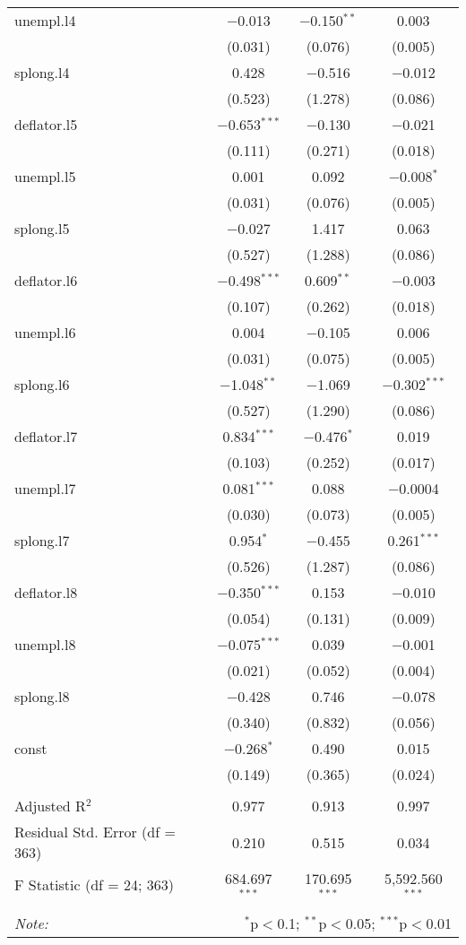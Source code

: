 \begin{table}[!htbp]
\begin{tabular}{@{\extracolsep{5pt}}lccc}
  unempl.l4 & $-$0.013 & $-$0.150$^{**}$ & 0.003 \\ 
  & (0.031) & (0.076) & (0.005) \\ 
  splong.l4 & 0.428 & $-$0.516 & $-$0.012 \\ 
  & (0.523) & (1.278) & (0.086) \\ 
  deflator.l5 & $-$0.653$^{***}$ & $-$0.130 & $-$0.021 \\ 
  & (0.111) & (0.271) & (0.018) \\ 
  unempl.l5 & 0.001 & 0.092 & $-$0.008$^{*}$ \\ 
  & (0.031) & (0.076) & (0.005) \\ 
  splong.l5 & $-$0.027 & 1.417 & 0.063 \\ 
  & (0.527) & (1.288) & (0.086) \\ 
  deflator.l6 & $-$0.498$^{***}$ & 0.609$^{**}$ & $-$0.003 \\ 
  & (0.107) & (0.262) & (0.018) \\ 
  unempl.l6 & 0.004 & $-$0.105 & 0.006 \\ 
  & (0.031) & (0.075) & (0.005) \\ 
  splong.l6 & $-$1.048$^{**}$ & $-$1.069 & $-$0.302$^{***}$ \\ 
  & (0.527) & (1.290) & (0.086) \\ 
  deflator.l7 & 0.834$^{***}$ & $-$0.476$^{*}$ & 0.019 \\ 
  & (0.103) & (0.252) & (0.017) \\ 
  unempl.l7 & 0.081$^{***}$ & 0.088 & $-$0.0004 \\ 
  & (0.030) & (0.073) & (0.005) \\ 
  splong.l7 & 0.954$^{*}$ & $-$0.455 & 0.261$^{***}$ \\ 
  & (0.526) & (1.287) & (0.086) \\ 
  deflator.l8 & $-$0.350$^{***}$ & 0.153 & $-$0.010 \\ 
  & (0.054) & (0.131) & (0.009) \\ 
  unempl.l8 & $-$0.075$^{***}$ & 0.039 & $-$0.001 \\ 
  & (0.021) & (0.052) & (0.004) \\ 
  splong.l8 & $-$0.428 & 0.746 & $-$0.078 \\ 
  & (0.340) & (0.832) & (0.056) \\ 
  const & $-$0.268$^{*}$ & 0.490 & 0.015 \\ 
  & (0.149) & (0.365) & (0.024) \\ 
 \hline \\[-1.8ex] 
Adjusted R$^{2}$ & 0.977 & 0.913 & 0.997 \\ 
Residual Std. Error (df = 363) & 0.210 & 0.515 & 0.034 \\ 
F Statistic (df = 24; 363) & 684.697$^{***}$ & 170.695$^{***}$ & 5,592.560$^{***}$ \\ 
\hline 
\hline \\[-1.8ex] 
\textit{Note:}  & \multicolumn{3}{r}{$^{*}$p$<$0.1; $^{**}$p$<$0.05; $^{***}$p$<$0.01} \\ 
\end{tabular} 
\end{table} 

